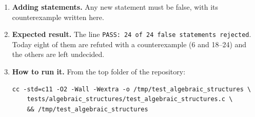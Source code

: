 \documentclass[11pt,a4paper]{article}
\begin{document}
\begin{enumerate}
\item \textbf{Adding statements.} Any new statement must be false, with its counterexample written here.

\item \textbf{Expected result.} The line \texttt{PASS: 24 of 24 false statements rejected}. Today eight of them are refuted with a counterexample (6 and 18--24) and the others are left undecided.

\item \textbf{How to run it.} From the top folder of the repository:
\begin{verbatim}
cc -std=c11 -O2 -Wall -Wextra -o /tmp/test_algebraic_structures \
    tests/algebraic_structures/test_algebraic_structures.c \
    && /tmp/test_algebraic_structures
\end{verbatim}
\end{enumerate}
\end{document}
